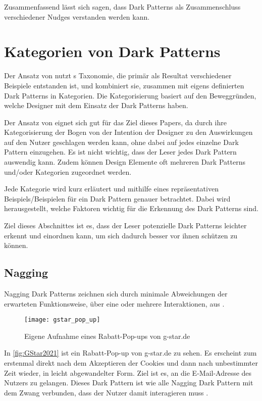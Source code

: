 \documentclass[conference,compsoc,final,a4paper]{IEEEtran}
\begin{document}
Zusammenfassend lässt sich sagen, dass Dark Patterns als Zusammenschluss verschiedener Nudges verstanden werden kann.

\section{Kategorien von Dark Patterns}
Der Ansatz von \citeauthor*{Gray_2018} \autocite{Gray_2018} nutzt \citeauthor{Brignull}s \autocite{Brignull} Taxonomie, die primär als Resultat verschiedener Beispiele entstanden ist, und kombiniert sie, zusammen mit eigens definierten Dark Patterns in Kategorien. Die Kategorisierung basiert auf den Beweggründen, welche Designer mit dem Einsatz der Dark Patterns haben.

Der Ansatz von \citeauthor*{Gray_2018} \autocite{Gray_2018} eignet sich gut für das Ziel dieses Papers, da durch ihre Kategorisierung der Bogen von der Intention der Designer zu den Auswirkungen auf den Nutzer geschlagen werden kann, ohne dabei auf jedes einzelne Dark Pattern einzugehen. Es ist nicht wichtig, dass der Leser jedes Dark Pattern auswendig kann. Zudem können Design Elemente oft mehreren Dark Patterns und/oder Kategorien zugeordnet werden.

Jede Kategorie wird kurz erläutert und mithilfe eines repräsentativen Beispiels/Beispielen für ein Dark Pattern genauer betrachtet. Dabei wird herausgestellt, welche Faktoren wichtig für die Erkennung des Dark Patterns sind.

Ziel dieses Abschnittes ist es, dass der Leser potenzielle Dark Patterns leichter erkennt und einordnen kann, um sich dadurch besser vor ihnen schützen zu können.
\subsection{Nagging}
Nagging Dark Patterns zeichnen sich durch minimale Abweichungen der erwarteten Funktionsweise, über eine oder mehrere Interaktionen, aus \autocite{Gray_2018}.

\begin{figure}[!ht]
  \centering
  \texttt{[image: gstar\_pop\_up]}
  \caption{Eigene Aufnahme eines Rabatt-Pop-ups von g-star.de~\autocite{GStar2021}}
  \label{fig:GStar2021}
\end{figure}

In \autoref{fig:GStar2021} ist ein Rabatt-Pop-up von g-star.de zu sehen. Es erscheint zum erstenmal direkt nach dem Akzeptieren der Cookies und dann nach unbestimmter Zeit wieder, in leicht abgewandelter Form. Ziel ist es, an die E-Mail-Adresse des Nutzers zu gelangen. Dieses Dark Pattern ist wie alle Nagging Dark Pattern mit dem Zwang verbunden, dass der Nutzer damit interagieren muss \autocite{Gray_2018}.
\end{document}
